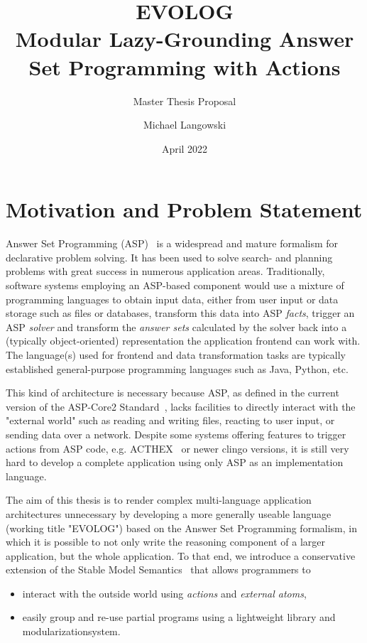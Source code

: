 \documentclass[12pt, letterpaper, twoside]{scrartcl}
\title{EVOLOG \\ Modular Lazy-Grounding Answer Set Programming with Actions}
\subtitle{Master Thesis Proposal}
\author{Michael Langowski}
\date{April 2022}
\begin{document}
\begin{titlepage}
\maketitle
\end{titlepage}

\section{Motivation and Problem Statement}
\label{sec:motivation}

Answer Set Programming (ASP)~\cite{asp-primer} is a widespread and mature formalism for declarative problem solving. It has been used to solve search- and planning problems with great success in numerous application areas. Traditionally, software systems employing an ASP-based component would use a mixture of programming languages to obtain input data, either from user input or data storage such as files or databases, transform this data into ASP \emph{facts}, trigger an ASP \emph{solver} and transform the \emph{answer sets} calculated by the solver back into a (typically object-oriented) representation the application frontend can work with. The language(s) used for frontend and data transformation tasks are typically established general-purpose programming languages such as Java, Python, etc.

This kind of architecture is necessary because ASP, as defined in the current version of the ASP-Core2 Standard~\cite{asp-core2}, lacks facilities to directly interact with the "external world" such as reading and writing files, reacting to user input, or sending data over a network. Despite some systems offering features to trigger actions from ASP code, e.g. ACTHEX~\cite{acthex} or newer clingo versions, it is still very hard to develop a complete application using only ASP as an implementation language.

The aim of this thesis is to render complex multi-language application architectures unnecessary by developing a more generally useable language (working title "EVOLOG") based on the Answer Set Programming formalism, in which it is possible to not only write the reasoning component of a larger application, but the whole application. To that end, we introduce a conservative extension of the Stable Model Semantics~\cite{stable-models} that allows programmers to
\begin{itemize}
	\item interact with the outside world using \emph{actions} and \emph{external atoms},
	\item easily group and re-use partial programs using a lightweight library and modularizationsystem.
\end{itemize}
\end{document}
